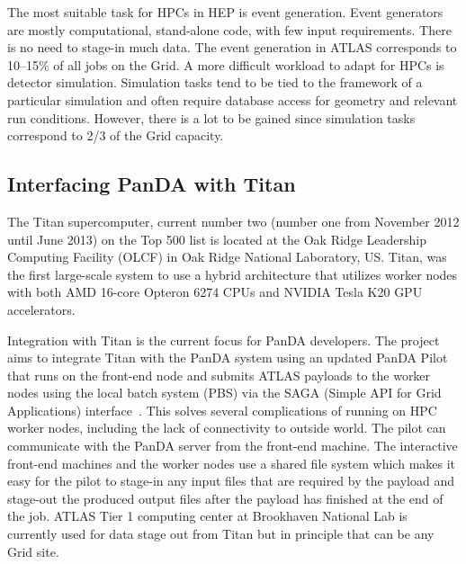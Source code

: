 The most suitable task for HPCs in HEP is event generation. Event generators are
mostly computational,  stand-alone code, with few input requirements.  There is
no need  to stage-in much data. The event generation  in ATLAS corresponds  to
10--15\% of all jobs on the Grid. A more difficult workload to adapt  for HPCs
is detector  simulation. Simulation tasks tend to be tied to the framework of a
particular simulation and often require  database access for geometry and
relevant run conditions.  However,  there is a  lot to be gained  since
simulation  tasks correspond to 2/3 of the Grid capacity.

\subsection{Interfacing PanDA with Titan}

The Titan supercomputer, current number two (number one from November 2012 until
June 2013) on the Top 500 list is located at the Oak Ridge Leadership Computing
Facility (OLCF) in Oak Ridge National Laboratory, US\@. Titan, was the first
large-scale system to use  a hybrid architecture that utilizes worker nodes with
both AMD 16-core Opteron 6274 CPUs and NVIDIA Tesla K20 GPU accelerators.

Integration with Titan is the current focus for PanDA developers. The project
aims to integrate Titan with the PanDA system using an updated PanDA Pilot that
runs on the front-end node and submits ATLAS payloads to the worker nodes using
the local batch system (PBS) via the SAGA (Simple API for Grid Applications)
interface~\cite{SAGA}. This solves several complications of  running on HPC
worker nodes,  including the lack of connectivity to outside world. The pilot
can communicate with the PanDA server from the front-end machine. The
interactive front-end  machines and the worker nodes  use  a shared  file system
which makes  it  easy  for the pilot to stage-in  any input files that are
required by the payload and stage-out the produced output files after the
payload has finished at the end of the job. ATLAS Tier 1 computing  center at
Brookhaven National Lab is currently  used for data stage out from Titan but in
principle  that can be any Grid site.

